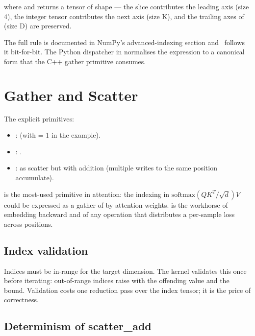  where  and
 returns a tensor of shape 
---  the slice  contributes the leading axis (size 4),
the integer tensor  contributes the next axis (size K),
and the trailing axes of  (size D) are preserved.

The full rule is documented in NumPy's advanced-indexing section
and \Lucid\ follows it bit-for-bit. The Python dispatcher in
 normalises the expression to a canonical form
that the C++ gather primitive consumes.

\section{Gather and Scatter}
\label{sec:indexing:gather_scatter}

The explicit primitives:

\begin{itemize}
  \item {}:  (with  = 1 in the
    example).
  \item {}: .
  \item {}: as scatter but
    with addition (multiple writes to the same position
    accumulate).
\end{itemize}

 is the most-used primitive in attention: the
indexing in $\text{softmax}(QK^T / \sqrt{d}) V$ could be expressed as
a gather of  by attention weights.  is
the workhorse of embedding backward and of any operation that
distributes a per-sample loss across positions.

\subsection{Index validation}
\label{ssec:indexing:index_validation}

Indices must be in-range for the target dimension. The kernel
validates this once before iterating: out-of-range indices raise
 with the offending value
and the bound. Validation costs one reduction pass over the index
tensor; it is the price of correctness.

\subsection{Determinism of scatter\_add}
\label{ssec:indexing:scatter_nondet}

